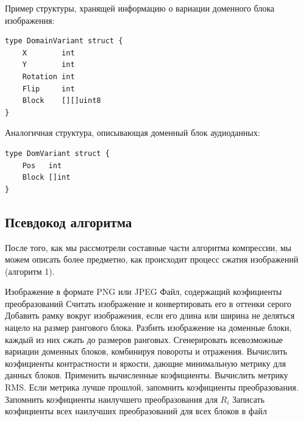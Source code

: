 \documentclass[bachelor,paper]{pmk-graduate}
\theoremstyle{definition}
\begin{document}
Пример структуры, хранящей информацию о вариации доменного блока изображения:
\begin{verbatim}
type DomainVariant struct {
    X        int
    Y        int
    Rotation int
    Flip     int
    Block    [][]uint8
}
\end{verbatim}

Аналогичная структура, описывающая доменный блок аудиоданных:
\begin{verbatim}
type DomVariant struct {
    Pos   int
    Block []int
}
\end{verbatim}

\subsection{Псевдокод алгоритма}

После того, как мы рассмотрели составные части алгоритма компрессии, мы можем описать более предметно, как происходит процесс сжатия изображений (алгоритм 1).

\begin{algorithm}
  \algrenewcommand{}
  \algrenewcommand{}
  \caption{Псевдокод основных этапов сжатия изображений}\label{alg1}
  \begin{algorithmic}[1]
    \Require Изображение в формате PNG или JPEG
    \Ensure Файл, содержащий коэфициенты преобразований
    \State Считать изображение и конвертировать его в оттенки серого
    \State Добавить рамку вокруг изображения, если его длина или ширина не деляться нацело на размер рангового блока.
    \State Разбить изображение на доменные блоки, каждый из них сжать до размеров ранговых.
    \State Сгенерировать всевозможные вариации доменных блоков, комбинируя повороты и отражения.
        \State Вычислить коэфициенты контрастности и яркости, дающие минимальную метрику для данных блоков.
        \State Применить вычисленные коэфициенты.
        \State Вычислить метрику RMS.
        \State Если метрика лучше прошлой, запомнить коэфициенты преобразования.
      \EndFor
      \State Запомнить коэфициенты наилучшего преобразования для $R_i$
    \EndFor
    \State Записать коэфициенты всех наилучших преобразований для всех блоков в файл
  \end{algorithmic}
\end{algorithm}
\end{document}
